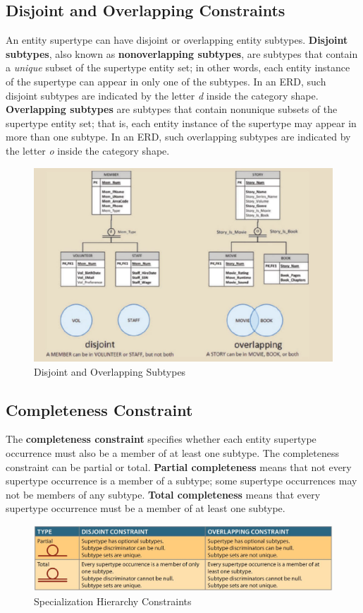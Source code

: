 \documentclass[a4paper, 12pt, titlepage]{report}
\begin{document}
{\subsection{Disjoint and Overlapping Constraints}
An entity supertype can have disjoint or overlapping entity subtypes. \textbf{Disjoint subtypes}, also known as \textbf{nonoverlapping subtypes}, are subtypes that contain a \emph{unique} subset of the supertype entity set; in other words, each entity instance of the supertype can appear in only one of the subtypes. In an ERD, such disjoint subtypes are indicated by the letter \emph{d} inside the category shape.\\
\textbf{Overlapping subtypes} are subtypes that contain nonunique subsets of the supertype entity set; that is, each entity instance of the supertype may appear in more than one subtype. In an ERD, such overlapping subtypes are indicated by the letter \emph{o} inside the category shape.
\begin{figure}[H]
\centering
\includegraphics[scale=0.4]{DisjOver}
\caption{Disjoint and Overlapping Subtypes}
\end{figure}
\subsection{Completeness Constraint}
The \textbf{completeness constraint} specifies whether each entity supertype occurrence must also be a member of at least one subtype. The completeness constraint can be partial or
total. \textbf{Partial completeness} means that not every supertype occurrence is a member of a subtype; some supertype occurrences may not be members of any subtype. \textbf{Total
completeness} means that every supertype occurrence must be a member of at least one subtype. 
\begin{figure}[H]
\centering
\includegraphics[scale=0.4]{Constraint}
\caption{Specialization Hierarchy Constraints}
\end{figure}
}
\end{document}
